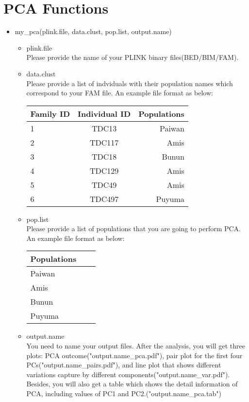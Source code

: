 \documentclass{article}
\begin{document}
\section{PCA Functions}
\begin{itemize}
    \item my\_pca(plink.file, data.clust, pop.list, output.name)
    \begin{itemize}
    \item plink.file \\
    Please provide the name of your PLINK binary files(BED/BIM/FAM).
    \end{itemize}
    \begin{itemize}
    \item data.clust \\
    Please provide a list of indviduals with their population names which correspond to your FAM file.
    An example file format as below:
    \begin{table}[ht]
    \centering
    \begin{tabular}{lcr}
    \hline
    Family ID & Individual ID & Populations \\ 
    \hline
    1 & TDC13 & Paiwan \\ 
    2 & TDC117 & Amis \\ 
    3 & TDC18 & Bunun \\ 
    4 & TDC129 & Amis \\
    5 & TDC49 & Amis \\
    6 & TDC497 & Puyuma \\
    \hline
    \end{tabular}
    \end{table}
    \end{itemize}
    \begin{itemize}
    \item pop.list \\
    Please provide a list of populations that you are going to perform PCA.
    An example file format as below:
    \begin{table}[ht]
    \centering
    \begin{tabular}{lcr}
    \hline
    Populations \\ 
    \hline
    Paiwan \\ 
    Amis \\ 
    Bunun \\ 
    Puyuma \\
    \hline
    \end{tabular}
    \end{table}
    \end{itemize}
    \begin{itemize}
    \item output.name \\
    You need to name your output files. After the analysis, you will get three plots: PCA outcome("output.name\_pca.pdf"), 
    pair plot for the first four PCs("output.name\_pairs.pdf"), and line plot that shows different variations capture by 
    different components("output.name\_var.pdf").
    Besides, you will also get a table which shows the detail information of PCA, including values of PC1 and PC2.("output.name\_pca.tab")
    \end{itemize}
\end{itemize}
\end{document}
